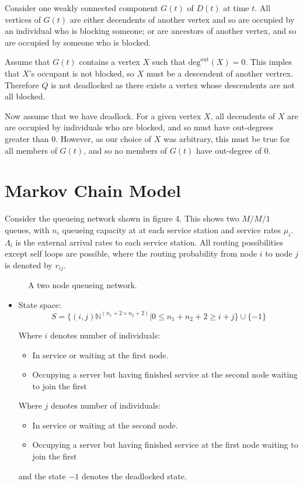 \documentclass{article}
\begin{document}
Consider one weakly connected component $G(t)$ of $D(t)$ at time $t$.
All vertices of $G(t)$ are either decendents of another vertex and so are occupied by an individual who is blocking someone; or are ancestors of another vertex, and so are occupied by someone who is blocked.\newline

Assume that $G(t)$ contains a vertex $X$ such that $\text{deg}^{\text{out}}(X) = 0$.
This imples that $X$'s occupant is not blocked, so $X$ must be a descendent of another vertrex.
Therefore $Q$ is not deadlocked as there exists a vertex whose descendents are not all blocked.\newline

Now assume that we have deadlock.
For a given vertex $X$, all decendents of $X$ are are occupied by individuals who are blocked, and so must have out-degrees greater than 0.
However, as our choice of $X$ was arbitrary, this must be true for all members of $G(t)$, and so no members of $G(t)$ have out-degree of 0.\newline


\section{Markov Chain Model}

Consider the queueing network shown in figure 4.
This shows two \(M/M/1\) queues, with \(n_i\) queueing capacity at at each service station and service rates $\mu_i$.
$\Lambda_i$ is the external arrival rates to each service station.
All routing possibilities except self loops are possible, where the routing probability from node $i$ to node $j$ is denoted by $r_{ij}$.

\begin{figure}[H]
  
  \caption{A two node queueing network.}
\end{figure}

\begin{itemize}
    \item State space:
        \[S = \{(i,j)\mathbb{N}^{(n_1+2\times n_2+2)}| 0 \leq n_1 + n_2 + 2
        \geq i + j \}\cup\{-1\}\]

        Where \(i\) denotes number of individuals:
            \begin{itemize}
                \item In service or waiting at the first node.
                \item Occupying a server but having finished service at the
                    second node waiting to join the first
            \end{itemize}
        Where \(j\) denotes number of individuals:
            \begin{itemize}
                \item In service or waiting at the second node.
                \item Occupying a server but having finished service at the
                    first node waiting to join the first
            \end{itemize}
        and the state \(-1\) denotes the deadlocked state.
\end{itemize}
\end{document}
